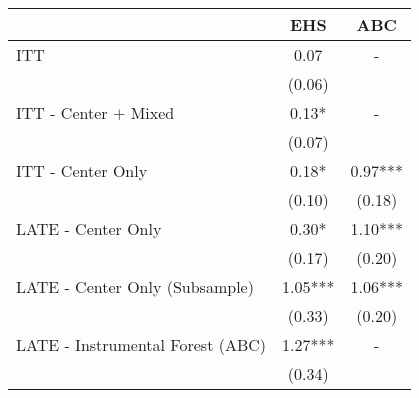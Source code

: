 \begin{tabular}{lcc}
\toprule 
\midrule 
 & EHS & ABC \\
\midrule 
ITT & 0.07 & - \\
 & (0.06) \\
ITT - Center $+$ Mixed & 0.13* & - \\
 & (0.07) \\
ITT - Center Only & 0.18* & 0.97*** \\
 & (0.10) & (0.18) \\
LATE - Center Only & 0.30* & 1.10*** \\
 & (0.17) & (0.20) \\
LATE - Center Only (Subsample) & 1.05*** & 1.06*** \\
 & (0.33) & (0.20) \\
LATE - Instrumental Forest (ABC) & 1.27*** & - \\
 & (0.34) \\
\midrule 
\bottomrule 
\end{tabular}
